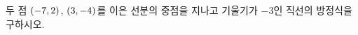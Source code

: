두 점 $(-7{,}\mkern3mu\mathopen{}2)$, $(3{,}\mkern3mu\mathopen{}-4)$를 이은 선분의 중점을 지나고 기울기가 $-3$인 직선의 방정식을 구하시오.
